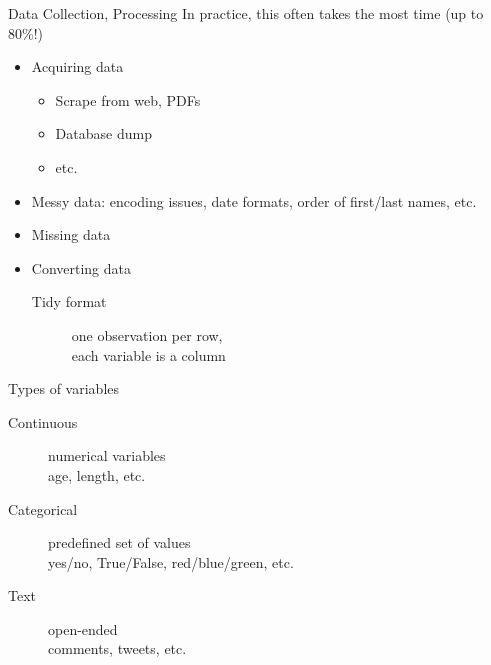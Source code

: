 \documentclass{beamer}
\begin{document}
\begin{frame}{Data Collection, Processing}
In practice, this often takes the most time (up to 80\%!)

\begin{itemize}
    \item Acquiring data
        \begin{itemize}
            \item Scrape from web, PDFs
            \item Database dump
            \item etc.
        \end{itemize}
    \item Messy data: encoding issues, date formats, order of first/last names, etc.
    \item Missing data
    \item Converting data
        \begin{description}
            \item[Tidy format] one observation per row, \\
                    each variable is a column
        \end{description}
\end{itemize}
\end{frame}



\begin{frame}{Types of variables}
    \begin{description}
        \item[Continuous] numerical variables\\
            age, length, etc.
        \item[Categorical] predefined set of values\\
            yes/no, True/False, red/blue/green, etc.
        \item[Text] open-ended \\
            comments, tweets, etc.
    \end{description}
\end{frame}
\end{document}
